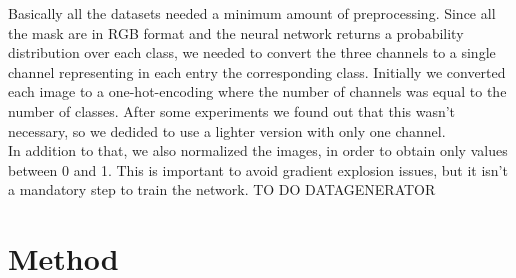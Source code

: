 \documentclass[10pt,twocolumn,letterpaper]{article}
\begin{document}
Basically all the datasets needed a minimum amount of preprocessing.
Since all the mask are in RGB format and the neural network returns a probability distribution over each class, we needed to convert the three channels to a single channel representing in each entry the corresponding class. Initially we converted each image to a one-hot-encoding where the number of channels was equal to the number of classes. After some experiments we found out that this wasn't necessary, so we dedided to use a lighter version with only one channel. \\
In addition to that, we also normalized the images, in order to obtain only values between 0 and 1. This is important to avoid gradient explosion issues, but it isn't a mandatory step to train the network.
TO DO DATAGENERATOR

\section{Method}
\end{document}
